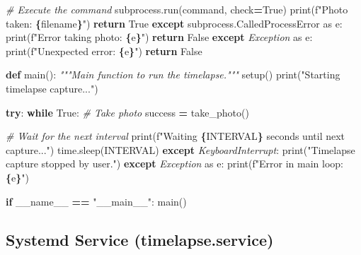 \documentclass[
]{article}
\newenvironment{Shaded}{\begin{snugshade}}{\end{snugshade}}
\newcommand{\BuiltInTok}[1]{#1}
\newcommand{\CommentTok}[1]{\textcolor[rgb]{0.56,0.35,0.01}{\textit{#1}}}
\newcommand{\ControlFlowTok}[1]{\textcolor[rgb]{0.13,0.29,0.53}{\textbf{#1}}}
\newcommand{\ImportTok}[1]{#1}
\newcommand{\KeywordTok}[1]{\textcolor[rgb]{0.13,0.29,0.53}{\textbf{#1}}}
\newcommand{\NormalTok}[1]{#1}
\newcommand{\OperatorTok}[1]{\textcolor[rgb]{0.81,0.36,0.00}{\textbf{#1}}}
\newcommand{\PreprocessorTok}[1]{\textcolor[rgb]{0.56,0.35,0.01}{\textit{#1}}}
\newcommand{\SpecialCharTok}[1]{\textcolor[rgb]{0.81,0.36,0.00}{\textbf{#1}}}
\newcommand{\SpecialStringTok}[1]{\textcolor[rgb]{0.31,0.60,0.02}{#1}}
\newcommand{\StringTok}[1]{\textcolor[rgb]{0.31,0.60,0.02}{#1}}
\newcommand{\VariableTok}[1]{\textcolor[rgb]{0.00,0.00,0.00}{#1}}
\begin{document}
\begin{Shaded}
\begin{Highlighting}[]
        \CommentTok{\# Execute the command}
\NormalTok{        subprocess.run(command, check}\OperatorTok{=}\VariableTok{True}\NormalTok{)}
        \BuiltInTok{print}\NormalTok{(}\SpecialStringTok{f"Photo taken: }\SpecialCharTok{\{}\NormalTok{filename}\SpecialCharTok{\}}\SpecialStringTok{"}\NormalTok{)}
        \ControlFlowTok{return} \VariableTok{True}
    \ControlFlowTok{except}\NormalTok{ subprocess.CalledProcessError }\ImportTok{as}\NormalTok{ e:}
        \BuiltInTok{print}\NormalTok{(}\SpecialStringTok{f"Error taking photo: }\SpecialCharTok{\{}\NormalTok{e}\SpecialCharTok{\}}\SpecialStringTok{"}\NormalTok{)}
        \ControlFlowTok{return} \VariableTok{False}
    \ControlFlowTok{except} \PreprocessorTok{Exception} \ImportTok{as}\NormalTok{ e:}
        \BuiltInTok{print}\NormalTok{(}\SpecialStringTok{f"Unexpected error: }\SpecialCharTok{\{}\NormalTok{e}\SpecialCharTok{\}}\SpecialStringTok{"}\NormalTok{)}
        \ControlFlowTok{return} \VariableTok{False}

\KeywordTok{def}\NormalTok{ main():}
    \CommentTok{"""Main function to run the timelapse."""}
\NormalTok{    setup()}
    \BuiltInTok{print}\NormalTok{(}\StringTok{"Starting timelapse capture..."}\NormalTok{)}
    
    \ControlFlowTok{try}\NormalTok{:}
        \ControlFlowTok{while} \VariableTok{True}\NormalTok{:}
            \CommentTok{\# Take photo}
\NormalTok{            success }\OperatorTok{=}\NormalTok{ take\_photo()}
            
            \CommentTok{\# Wait for the next interval}
            \BuiltInTok{print}\NormalTok{(}\SpecialStringTok{f"Waiting }\SpecialCharTok{\{}\NormalTok{INTERVAL}\SpecialCharTok{\}}\SpecialStringTok{ seconds until next capture..."}\NormalTok{)}
\NormalTok{            time.sleep(INTERVAL)}
    \ControlFlowTok{except} \PreprocessorTok{KeyboardInterrupt}\NormalTok{:}
        \BuiltInTok{print}\NormalTok{(}\StringTok{"Timelapse capture stopped by user."}\NormalTok{)}
    \ControlFlowTok{except} \PreprocessorTok{Exception} \ImportTok{as}\NormalTok{ e:}
        \BuiltInTok{print}\NormalTok{(}\SpecialStringTok{f"Error in main loop: }\SpecialCharTok{\{}\NormalTok{e}\SpecialCharTok{\}}\SpecialStringTok{"}\NormalTok{)}

\ControlFlowTok{if} \VariableTok{\_\_name\_\_} \OperatorTok{==} \StringTok{"\_\_main\_\_"}\NormalTok{:}
\NormalTok{    main()}
\end{Highlighting}
\end{Shaded}

\subsection{Systemd Service
(timelapse.service)}\label{systemd-service-timelapse.service}
\end{document}
